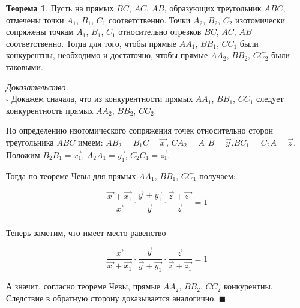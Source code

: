 \documentclass[14pt]{extarticle}
\let\vecarrow\overrightarrow
\theoremstyle{definition}
\theoremstyle{theorem}
\newtheorem*{theorem}{Теорема}
\renewenvironment{proof}
    {\noindent \textit{Доказательство.}\\
	\indent $\square$}
	{ $\blacksquare$\\ }
\begin{document}
\begin{theorem}
Пусть на прямых \(BC\), \(AC\), \(AB\), образующих треугольник \(ABC\),
отмечены точки \(A_1\), \(B_1\), \(C_1\) соответственно. Точки
\(A_2\), \(B_2\), \(C_2\) изотомически сопряжены точкам \(A_1\), \(B_1\), 
\(C_1\) относительно отрезков \(BC\), \(AC\), \(AB\) соответственно.
Тогда для того, чтобы прямые \(AA_1\), \(BB_1\), \(CC_1\) были конкурентны,
необходимо и достаточно, чтобы прямые \(AA_2\), \(BB_2\), \(CC_2\) были таковыми.
\end{theorem}


\begin{proof}
Докажем сначала, что из конкурентности прямых \(AA_1\), \(BB_1\), \(CC_1\)
следует конкурентность прямых \(AA_2\), \(BB_2\), \(CC_2\). 

\begin{figure}
\end{figure}

По определению изотомического сопряжения точек относительно сторон треугольника
\(ABC\) имеем: \(AB_2 = B_1C = \vecarrow{x_{\,}}\), \(CA_2 = A_1B = 
\vecarrow{y_{\,}}\),\(BC_1 = C_2A = \vecarrow{z_{\,}}\).
Положим \(B_2B_1 = \vecarrow{x_1}\), \(A_2A_1 = \vecarrow{y_1}\), \(C_2C_1 = 
\vecarrow{z_1}\).

Тогда по теореме Чевы  для прямых \(AA_1\), \(BB_1\), \(CC_1\) получаем:

\[
\frac{\vecarrow{x_{\,}} + \vecarrow{x_1}}{\vecarrow{x_{\,}}} \cdot
\frac{\vecarrow{y_{\,}} + \vecarrow{y_1}}{\vecarrow{y_{\,}}} \cdot
\frac{\vecarrow{z_{\,}} + \vecarrow{z_1}}{\vecarrow{z_{\,}}} 
= 1
\] \\


Теперь заметим, что имеет место равенство 
\begin{ceqn}
\[
\frac{\vecarrow{x_{\,}}}{\vecarrow{x_{\,}} + \vecarrow{x_1}} \cdot
\frac{\vecarrow{y_{\,}}}{\vecarrow{y_{\,}} + \vecarrow{y_1}} \cdot
\frac{\vecarrow{z_{\,}}}{\vecarrow{z_{\,}} + \vecarrow{z_1}} 
= 1
\]
\end{ceqn}

А значит, согласно теореме Чевы, прямые \(AA_2\), \(BB_2\), \(CC_2\) конкурентны.
Следствие в обратную сторону доказывается аналогично.
\end{proof}
\end{document}
